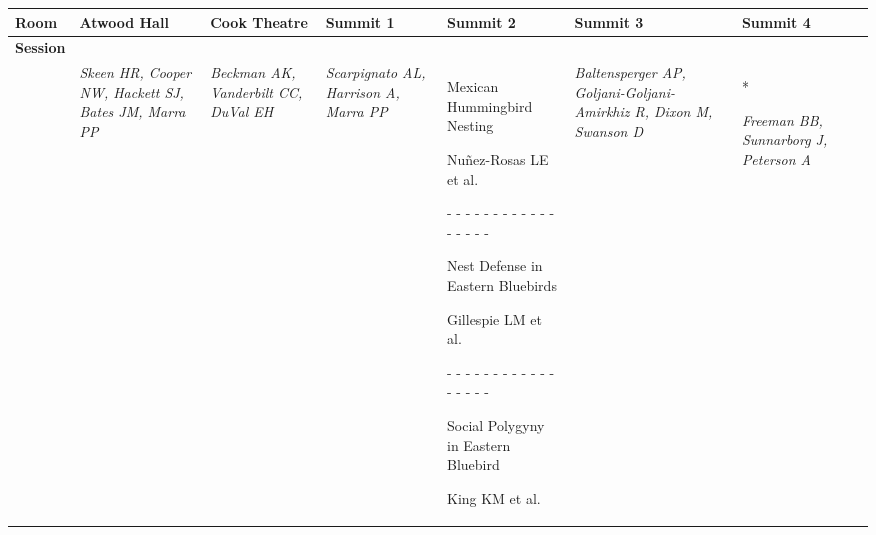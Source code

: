 \begin{tabular}{|x{0.8cm}|x{2.65cm}|x{2.65cm}|a{2.65cm}|x{2.65cm}|x{2.65cm}|x{2.65cm}|@{}m{0pt}@{}}\hline
Room & Atwood Hall & Cook Theatre & Summit 1 & Summit 2 & Summit 3 & Summit 4&\\
\hline
\rule{0pt}{1em} \textbf{Session} &\footnotesize \textbf{} & \footnotesize \textbf{} & \footnotesize \textbf{} & \footnotesize \textbf{} & \footnotesize \textbf{} & \footnotesize \textbf{}&\\[25ex]
\hline
{}& \par \vspace{8pt} \textit{Skeen HR, Cooper NW, Hackett SJ, Bates JM, Marra PP} &  \par \vspace{8pt} \textit{Beckman AK, Vanderbilt CC, DuVal EH} &  \par \vspace{8pt} \textit{Scarpignato AL, Harrison A, Marra PP} & \scriptsize Mexican Hummingbird Nesting\par \tiny Nu\~{n}ez-Rosas LE et al. \par - - - - - - - - - - - - - - - - - \par \vspace{2pt} \scriptsize Nest Defense in Eastern Bluebirds\par \tiny Gillespie LM et al. \par - - - - - - - - - - - - - - - - - \par \vspace{2pt} \scriptsize Social Polygyny in Eastern Bluebird\par \tiny King KM et al.  &  \par \vspace{8pt} \textit{Baltensperger AP, Goljani-Goljani-Amirkhiz R, Dixon M, Swanson D} & * \par \vspace{8pt} \textit{Freeman BB, Sunnarborg J, Peterson A}&\\[25ex]

\end{tabular}
